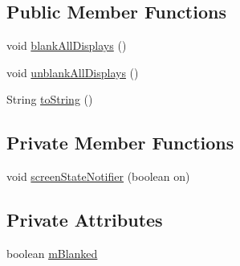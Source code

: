 \subsection*{Public Member Functions}
\begin{DoxyCompactItemize}
\item 
void \hyperlink{classcom_1_1android_1_1server_1_1power_1_1PowerManagerService_1_1DisplayBlankerImpl_a44d0289807a476d574b0c5545520c937}{blank\-All\-Displays} ()
\item 
void \hyperlink{classcom_1_1android_1_1server_1_1power_1_1PowerManagerService_1_1DisplayBlankerImpl_a7bf7b567ffe18d6263bba13baa1f8673}{unblank\-All\-Displays} ()
\item 
String \hyperlink{classcom_1_1android_1_1server_1_1power_1_1PowerManagerService_1_1DisplayBlankerImpl_a73bfd3b63c1fb9424a7e3a7d08c6bbf4}{to\-String} ()
\end{DoxyCompactItemize}
\subsection*{Private Member Functions}
\begin{DoxyCompactItemize}
\item 
void \hyperlink{classcom_1_1android_1_1server_1_1power_1_1PowerManagerService_1_1DisplayBlankerImpl_a2b01016d7172201aae2e8f417327c84d}{screen\-State\-Notifier} (boolean on)
\end{DoxyCompactItemize}
\subsection*{Private Attributes}
\begin{DoxyCompactItemize}
\item 
boolean \hyperlink{classcom_1_1android_1_1server_1_1power_1_1PowerManagerService_1_1DisplayBlankerImpl_a2588920f9e1fca260ee7a4e4738c5bed}{m\-Blanked}
\end{DoxyCompactItemize}


